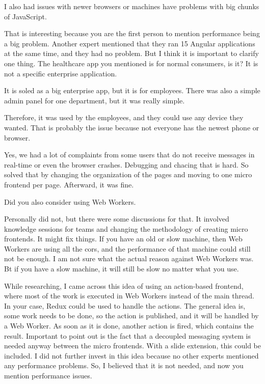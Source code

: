 \begin{description}
    \IvanJovanovic I also had issues with newer browsers or machines have problems with big chunks of JavaScript.

    \NicoVogel That is interesting because you are the first person to mention performance being a big problem. Another expert mentioned that they ran 15 Angular applications at the same time, and they had no problem. But I think it is important to clarify one thing. The healthcare app you mentioned is for normal consumers, is it? It is not a specific enterprise application.

    \IvanJovanovic It is soled as a big enterprise app, but it is for employees. There was also a simple admin panel for one department, but it was really simple.

    \NicoVogel Therefore, it was used by the employees, and they could use any device they wanted. That is probably the issue because not everyone has the newest phone or browser.

    \IvanJovanovic Yes, we had a lot of complaints from some users that do not receive messages in real-time or even the browser crashes. Debugging and chacing that is hard. So solved that by changing the organization of the pages and moving to one micro frontend per page. Afterward, it was fine.

    \NicoVogel Did you also consider using Web Workers.

    \IvanJovanovic Personally did not, but there were some discussions for that. It involved knowledge sessions for teams and changing the methodology of creating micro frontends. It might fix things. If you have an old or slow machine, then Web Workers are using all the cors, and the performance of that machine could still not be enough.
    I am not sure what the actual reason against Web Workers was. Bt if you have a slow machine, it will still be slow no matter what you use.

    \NicoVogel While researching, I came across this idea of using an action-based frontend, where most of the work is executed in Web Workers instead of the main thread. In your case, Redux could be used to handle the actions. The general idea is, some work needs to be done, so the action is published, and it will be handled by a Web Worker. As soon as it is done, another action is fired, which contains the result. Important to point out is the fact that a decoupled messaging system is needed anyway between the micro frontends. With a slide extension, this could be included.
    I did not further invest in this idea because no other experts mentioned any performance problems. So, I believed that it is not needed, and now you mention performance issues.


\end{description}
